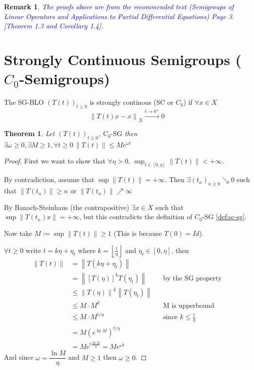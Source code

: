 \documentclass[12pt, oneside]{book}
\newtheorem{remark}{Remark}[section]
\newtheorem{theo}{Theorem}[section]
\newcommand{\norm}[1]{\left\lVert#1\right\rVert}
\begin{document}
\begin{remark}
	\textcolor{blue}{The proofs above are from the recommended text (Semigroups of Linear Operators and Applications to Partial Differential Equations) Page 3. [Theorem 1.3 and Corollary 1.4].}
\end{remark}

\section{\texorpdfstring{Strongly Continuous Semigroups ($C_0$-Semigroups)}{Strongly Continuous Semigroups}}

\begin{definition}\label{def:sc-sg}
	The SG-BLO $(T(t))_{t \ge 0}$ is strongly continous (SC or $C_0$) if $\forall x \in X$
	$$
		\norm{T(t)x - x}_{X} \xrightarrow{t \to 0^+} 0
	$$
\end{definition}

\begin{theo}\label{thm:sc-bdd}
	Let $(T(t))_{t \ge 0}$, $\text{C}_0\text{-SG}$ then $\exists \omega \ge 0, \exists M \ge 1, \forall t \ge 0 \, \norm{T(t)} \le Me^{\omega t}$
\end{theo}

\begin{proof}
	First we want to show that $\forall \eta > 0, \, \sup_{t \in [0, \eta]}{\norm{T(t)}} < +\infty$.

	By contradiction, assume that $\sup{\norm{T(t)}} = +\infty$. Then $\exists (t_n)_{n \ge 0} \searrow 0$ such that $\norm{T(t_n)} \ge n$ or $\norm{T(t_n)} \nearrow \infty$

	By Banach-Steinhaus (the contrapositive) $\exists x \in X$ such that $\sup{\norm{T(t_n)x}} = + \infty$, but this contradicts the definition of $C_0$-SG \ref{def:sc-sg}.

	Now take $M := \sup{\norm{T(t)}} \ge 1$ (This is because $T(0) = Id$).

	$\forall t \ge 0$ write $t = k\eta + \eta_t$ where $k = \left\lfloor{\frac{t}{\eta}}\right\rfloor$ and $\eta_t \in [0, \eta]$, then
	\begin{align*}
		\norm{T(t)} &= \norm{T(k\eta + \eta_t)} \\
			    &= \norm{\left[T(\eta)\right]^k T(\eta_t)} && \text{by the SG property} \\
			    &\le \norm{T(\eta)}^k \norm{T(\eta_t)} \\
			    &\le M \cdot M^k && \text{M is upperbound}\\
			    &\le M \cdot M^{t/\eta} && \text{since } k \le \frac{t}{\eta} \\
			    &= M (e^{\ln{M}})^{t/\eta} \\
			    &= M e^{t {\frac{\ln{M}}{\eta}}} = M e^{\omega t}
	\end{align*}
	And since $\omega = \dfrac{\ln{M}}{\eta}$ and $M \ge 1$ then $\omega \ge 0$. 
\end{proof}
\end{document}
